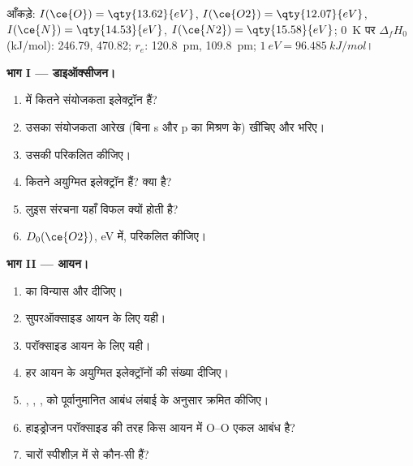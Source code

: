 \begin{problem}
\label{pb:b2:diatomic-mos:1}
आँकड़े: $I(\ce{O}) = \qty{13.62}{eV}$, $I(\ce{O2}) = \qty{12.07}{eV}$, $I(\ce{N}) =
\qty{14.53}{eV}$, $I(\ce{N2}) = \qty{15.58}{eV}$; \qty{0}{K} पर $\Delta_f H_0$
(\unit{kJ/mol}):  246.79,  470.82; $r_e$:  \qty{120.8}{pm}, 
\qty{109.8}{pm}; $1\ \unit{eV} = \qty{96.485}{kJ/mol}$।

\medskip
\noindent\textbf{भाग I --- डाइऑक्सीजन।}
\begin{enumerate}
  \item {} में कितने संयोजकता इलेक्ट्रॉन हैं?
  \item उसका संयोजकता  आरेख (बिना s और p का मिश्रण के) खींचिए और भरिए।
  \item उसकी  परिकलित कीजिए।
  \item कितने अयुग्मित इलेक्ट्रॉन हैं? क्या   है?
  \item लुइस संरचना यहाँ विफल क्यों होती है?
  \item $D_0(\ce{O2})$, \unit{eV} में, परिकलित कीजिए।
\end{enumerate}

\medskip
\noindent\textbf{भाग II --- आयन।}
\begin{enumerate}[resume]
  \item {} का विन्यास और  दीजिए।
  \item सुपरऑक्साइड आयन  के लिए यही।
  \item परॉक्साइड आयन  के लिए यही।
  \item हर आयन के अयुग्मित इलेक्ट्रॉनों की संख्या दीजिए।
  \item {}, , ,  को पूर्वानुमानित आबंध लंबाई के अनुसार क्रमित कीजिए।
  \item हाइड्रोजन परॉक्साइड की तरह किस आयन में O--O एकल आबंध है?
  \item चारों स्पीशीज़ में से कौन-सी  हैं?
\end{enumerate}


\end{problem}
